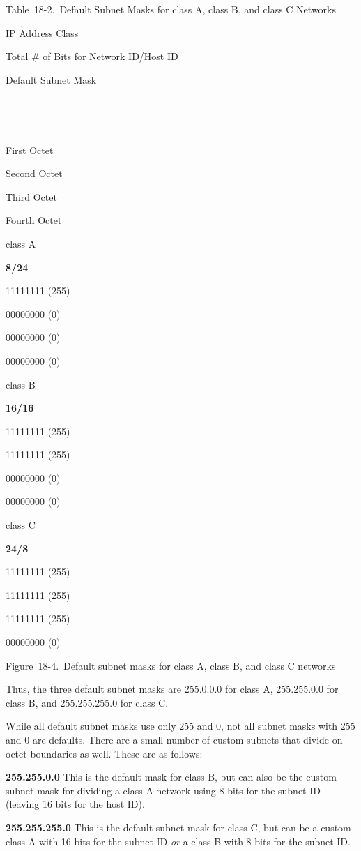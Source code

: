 Table~18-2.~Default Subnet Masks for class A, class B, and class C
Networks

IP Address Class

Total \# of Bits for Network ID/Host ID

Default
Subnet Mask

~

~

First Octet

Second Octet

Third Octet

Fourth Octet

class A

{\textbf{8/24}}

11111111 (255)

00000000 (0)

00000000 (0)

00000000 (0)

class B

{\textbf{16/16}}

11111111 (255)

11111111 (255)

00000000 (0)

00000000 (0)

class C

{\textbf{24/8}}

11111111 (255)

11111111 (255)

11111111 (255)

00000000 (0)





Figure~18-4.~Default subnet masks for class A, class B, and class C
networks

Thus, the
three default subnet masks are 255.0.0.0 for class A, 255.255.0.0 for
class B, and 255.255.255.0 for class C.

While all default subnet masks use only 255 and 0, not all subnet masks
with 255 and 0 are defaults. There are a small number of custom subnets
that divide on octet boundaries as well. These are as follows:

{\textbf{255.255.0.0}} This is the default mask for class B, but can
also be the custom subnet mask for dividing a class A network using 8
bits for the subnet ID (leaving 16 bits for the host ID).

{\textbf{255.255.255.0}} This is the default subnet mask for class C,
but can be a custom class A with 16 bits for the subnet ID {\emph{or}} a
class B with 8 bits for the subnet ID.


